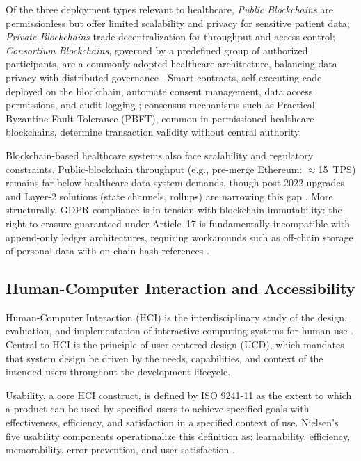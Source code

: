 \documentclass[journal,onecolumn]{IEEEtran}
\begin{document}
Of the three deployment types relevant to healthcare, \textit{Public Blockchains} are permissionless but offer limited scalability and privacy for sensitive patient data; \textit{Private Blockchains} trade decentralization for throughput and access control; \textit{Consortium Blockchains}, governed by a predefined group of authorized participants, are a commonly adopted healthcare architecture, balancing data privacy with distributed governance \cite{yaqub2025blockchain}. Smart contracts, self-executing code deployed on the blockchain, automate consent management, data access permissions, and audit logging \cite{kim2022blockchain}; consensus mechanisms such as Practical Byzantine Fault Tolerance (PBFT), common in permissioned healthcare blockchains, determine transaction validity without central authority.

Blockchain-based healthcare systems also face scalability and regulatory constraints. Public-blockchain throughput (e.g., pre-merge Ethereum: $\approx$15~TPS) remains far below healthcare data-system demands, though post-2022 upgrades and Layer-2 solutions (state channels, rollups) are narrowing this gap \cite{wood2014ethereum,yaqub2023enhancing}. More structurally, GDPR compliance is in tension with blockchain immutability: the right to erasure guaranteed under Article~17 is fundamentally incompatible with append-only ledger architectures, requiring workarounds such as off-chain storage of personal data with on-chain hash references \cite{yaqub2023enhancing}.

\subsection{Human-Computer Interaction and Accessibility}
Human-Computer Interaction (HCI) is the interdisciplinary study of the design, evaluation, and implementation of interactive computing systems for human use \cite{alfayez2024user}. Central to HCI is the principle of user-centered design (UCD), which mandates that system design be driven by the needs, capabilities, and context of the intended users throughout the development lifecycle.

Usability, a core HCI construct, is defined by ISO 9241-11 \cite{iso9241} as the extent to which a product can be used by specified users to achieve specified goals with effectiveness, efficiency, and satisfaction in a specified context of use. Nielsen's five usability components operationalize this definition as: learnability, efficiency, memorability, error prevention, and user satisfaction \cite{tharatipyakul2021user}.
\end{document}
